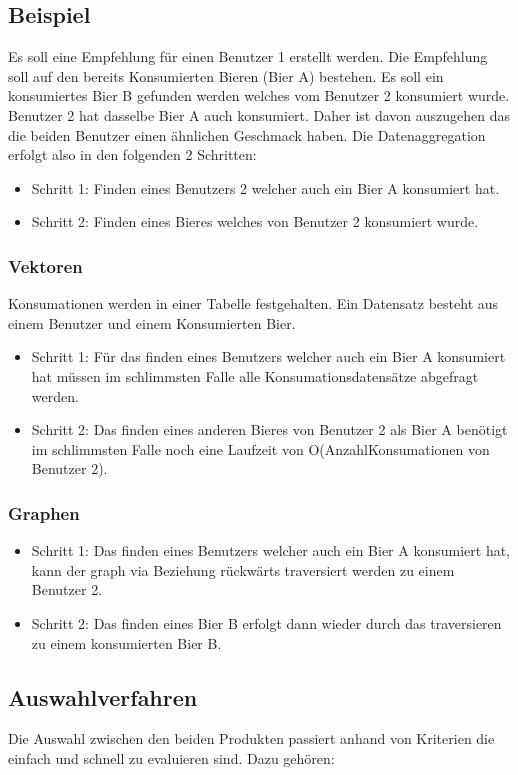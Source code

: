 \documentclass[10pt,a4paper]{scrartcl}
\begin{document}
\subsection{Beispiel}
Es soll eine Empfehlung für einen Benutzer 1 erstellt werden. Die Empfehlung soll auf den bereits Konsumierten Bieren (Bier A) bestehen. Es soll ein konsumiertes Bier B gefunden werden welches vom Benutzer 2 konsumiert wurde. Benutzer 2 hat dasselbe Bier A auch konsumiert. Daher ist davon auszugehen das die beiden Benutzer einen ähnlichen Geschmack haben. Die Datenaggregation erfolgt also in den folgenden 2 Schritten:
\begin{itemize}
\item Schritt 1: Finden eines Benutzers 2 welcher auch ein Bier A konsumiert hat.
\item Schritt 2:  Finden eines Bieres welches von Benutzer 2 konsumiert wurde.

\end{itemize}

\subsubsection{Vektoren}
Konsumationen werden in einer Tabelle festgehalten. Ein Datensatz besteht aus einem Benutzer und einem Konsumierten Bier.
\begin{itemize}
\item Schritt 1: Für das finden eines Benutzers welcher auch ein Bier A konsumiert hat müssen im schlimmsten Falle alle Konsumationsdatensätze abgefragt werden.
\item Schritt 2: Das finden eines anderen Bieres von Benutzer 2 als Bier A benötigt im schlimmsten Falle noch eine Laufzeit von O(AnzahlKonsumationen von Benutzer 2).
\end{itemize}

\subsubsection{Graphen}
\begin{itemize}
\item Schritt 1: Das finden eines Benutzers welcher auch ein Bier A konsumiert hat, kann der graph via Beziehung rückwärts traversiert werden zu einem Benutzer 2.
\item Schritt 2: Das finden eines Bier B erfolgt dann wieder durch das traversieren zu einem konsumierten Bier B.
\end{itemize}
\subsection{Auswahlverfahren}
Die Auswahl zwischen den beiden Produkten passiert anhand von Kriterien die einfach und schnell zu evaluieren sind. Dazu gehören:
\end{document}
